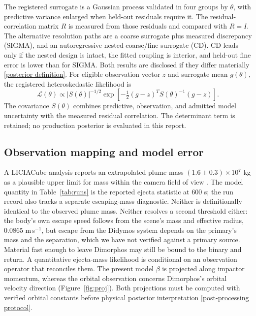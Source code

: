 \documentclass[10pt,twocolumn]{article}
\newcommand{\repo}[2]{\href{https://github.com/Yagiz-D-Ekrem-Dolar/dart-rift/blob/a35dab4/#1}{#2}}
\begin{document}
The registered surrogate is a Gaussian process validated
in four groups by $\theta$, with predictive variance enlarged
when held-out residuals require it. The residual-correlation
matrix $R$ is measured from those residuals and compared with
$R=I$. The alternative resolution paths are a coarse
surrogate plus measured discrepancy (SIGMA), and an
autoregressive nested coarse/fine surrogate (CD). CD leads
only if the nested design is intact, the fitted coupling
is interior, and held-out fine error is lower than for
SIGMA. Both results are disclosed if they differ materially
\repo{docs/adr/ADR-0058-uretim-posteriorunun-tarifi.md}{[posterior definition]}.
For eligible observation vector $z$ and surrogate mean
$g(\theta)$, the registered heteroskedastic likelihood is
\begin{equation}
\mathcal{L}(\theta)\propto
|S(\theta)|^{-1/2}
\exp\!\left[-\tfrac12
(g-z)^{T}S(\theta)^{-1}(g-z)\right].
\label{eq:likelihood}
\end{equation}
The covariance $S(\theta)$ combines predictive, observation,
and admitted model uncertainty with the measured residual
correlation. The determinant term is retained; no production
posterior is evaluated in this report.

\subsection{Observation mapping and model error}
A LICIACube analysis reports an extrapolated plume mass
$(1.6\pm0.3)\times10^7$ kg as a plausible upper limit
for mass within the camera field of view
\cite{lolachi2025}. The model quantity in Table~\ref{tab:runs}
is the reported ejecta statistic at 600 s; the run record
also tracks a separate escaping-mass diagnostic. Neither is definitionally
identical to the observed plume mass. Neither resolves a second
threshold either: the body's own escape speed follows from the scene's
mass and effective radius, $0.0865$ m\,s$^{-1}$, but escape from the
Didymos system depends on the primary's mass and the separation, which
we have not verified against a primary source. Material fast enough to
leave Dimorphos may still be bound to the binary and return.
 A quantitative ejecta-mass likelihood is
conditional on an observation operator that reconciles them.
The present model $\beta$ is projected along impactor momentum,
whereas the orbital observation concerns Dimorphos's orbital
velocity direction (Figure~\ref{fig:proj}). Both projections must be
computed with verified orbital constants before physical posterior
interpretation
\repo{docs/truba/PROTOKOL-SI-SON-ISLEME.md}{[post-processing protocol]}.
\end{document}
